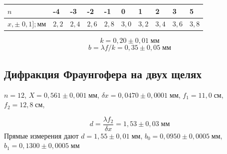 \begin{tabular}{|l|l|l|l|l|l|l|l|l|l|}
\hline
    $n$ & -4 & -3 & -2 & -1 & 0 & 1 & 2 & 3 & 5 \\\hline
    $x,\pm\;0{,}1];\text{мм}$ & $2{,}2$ & $2{,}4$ & $2{,}6$ & $2{,}8$ & $3{,}0$ & $3{,}2$ & $3{,}4$ & $3{,}6$ & $3{,}8$ \\\hline
\end{tabular}
\begin{figure}[ht!]
\end{figure}

\[
    k = 0{,}20 \pm 0{,}01\;\text{мм}
\]
\[
    b = \lambda f / k = 0{,}35 \pm 0{,}05 \;\text{мм}
\]

\subsection{Дифракция Фраунгофера на двух щелях}
$n = 12$, $X = 0{,}561 \pm 0{,}001\;\text{мм}$, $\delta x = 0{,}0470 \pm 0{,}0001\;\text{мм}$, $f_{1} = 11{,}0\;\text{см}$, $f_{2} = 12{,}8\;\text{см}$, 

\[
    d = \frac{ \lambda f_{2}}{\delta x} = 1{,}53 \pm 0{,}03\;\text{мм} 
\]
Прямые измерения дают $d = 1{,}55 \pm 0{,}01 \;\text{мм}$, $b_{0} = 0{,}0950 \pm 0{,}0005\;\text{мм}$, $b_{1} = 0{,}1300 \pm 0{,}0005\;\text{мм}$

